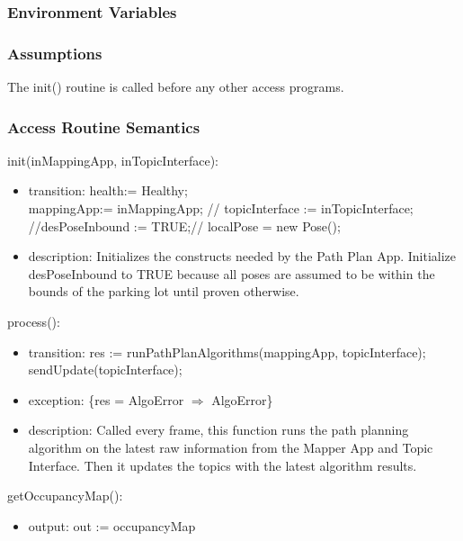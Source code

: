 \documentclass[12pt, titlepage]{article}
\begin{document}
\subsubsection{Environment Variables}
\subsubsection{Assumptions}
The init() routine is called before any other access programs.
\subsubsection{Access Routine Semantics}
\noindent init(inMappingApp, inTopicInterface):
\begin{itemize}
\item transition: health:= Healthy; \\ mappingApp:= inMappingApp; // topicInterface := inTopicInterface; //desPoseInbound := TRUE;//
localPose = new Pose(); 
\item description: Initializes the constructs needed by the Path Plan App. Initialize desPoseInbound to TRUE because all poses are assumed to be within the bounds of the parking lot until proven otherwise.
\end{itemize}
\noindent process():
\begin{itemize}
\item transition: res := runPathPlanAlgorithms(mappingApp, topicInterface); \\
sendUpdate(topicInterface);
\item exception: \{res = AlgoError $\Rightarrow$ AlgoError\}
\item description: Called every frame, this function runs the path planning algorithm on the latest raw information from the Mapper App and Topic Interface. Then it updates the topics with the latest algorithm results.
\end{itemize}
\noindent getOccupancyMap():
\begin{itemize}
\item output: out := occupancyMap
\end{itemize}
\end{document}
